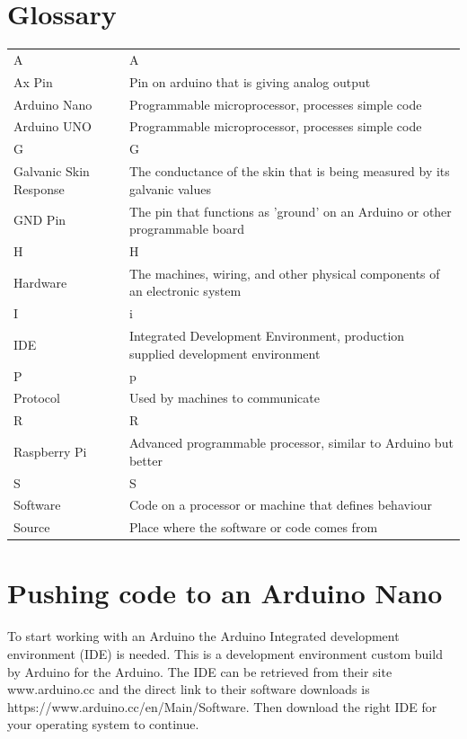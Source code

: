 \documentclass{report}
\begin{document}
\chapter{Glossary}
\begin{tabular}{ p{5cm} p{5cm} }
A & A \\
Ax Pin & Pin on arduino that is giving analog output \\
Arduino Nano & Programmable microprocessor, processes simple code \\
Arduino UNO & Programmable microprocessor, processes simple code \\
G & G \\
Galvanic Skin Response & The conductance of the skin that is being measured by its galvanic values \\
GND Pin & The pin that functions as 'ground' on an Arduino or other programmable board \\
H & H \\
Hardware & The machines, wiring, and other physical components of an electronic system \\
I & i \\
IDE & Integrated Development Environment, production supplied development environment \\
P & p \\
Protocol & Used by machines to communicate \\
R & R \\
Raspberry Pi & Advanced programmable processor, similar to Arduino but better \\
S & S \\
Software & Code on a processor or machine that defines behaviour \\
Source & Place where the software or code comes from \\
\end{tabular}


\chapter{Pushing code to an Arduino Nano}
To start working with an Arduino the Arduino Integrated development environment (IDE) is needed. This is a development environment custom build by Arduino for the Arduino. The IDE can be retrieved from their site www.arduino.cc and the direct link to their software downloads is https://www.arduino.cc/en/Main/Software. Then download the right IDE for your operating system to continue. \\
\end{document}
